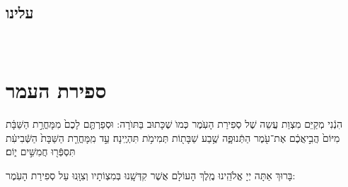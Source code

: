 \documentclass[twoside, openany, parskip=half, 11pt]{book}
\begin{document}
\tachanunim 

\vspace{\baselineskip}
 
\fullkaddish

\vfill

\\ 
\\

\clearpage
\section*{ עלינו }

\aleinu


\vfill

\quad{}\quad{}\\

\chapter[ספירת העמר]{ ספירת העמר }
\label{sefiras haomer}

הִנְֿנִי מְקַיֵּם מִצְוַת עֲשֵה שֶׁל סְפִירַת הָעֽׂמֶר כְּמוׂ שֶׁכָּתוּב בַּתּוׂרָה: וּסְפַרְתֶּ֤ם לָכֶם֙ מִמָּחֳרַ֣ת הַשַּׁבָּ֔ת מִיּוֹם֙ הֲבִ֣יאֲכֶ֔ם אֶת־עֹ֖מֶר הַתְּֿנוּפָ֑ה שֶׁ֥בַע שַׁבָּת֖וֹת תְּמִימֹ֥ת תִּהְיֶֽינָה׃ עַ֣ד מִֽמָּחֳרַ֤ת הַשַּׁבָּת֙ הַשְּֿׁבִיעִ֔ת תִּסְפְּֿר֖וּ חֲמִשִּׁ֣ים י֑וֹם׃

בָּרוּךְ אַתָּה יְיָ אֱלֹהֵֽינוּ מֶֽלֶךְ הָעוֹלָם אֲשֶׁר קִדְּשָֽׁנוּ בְּמִצְוֹתָיו וְצִוָּֽנוּ עַל סְפִירַת הָעֹֽמֶר:\\
\end{document}

